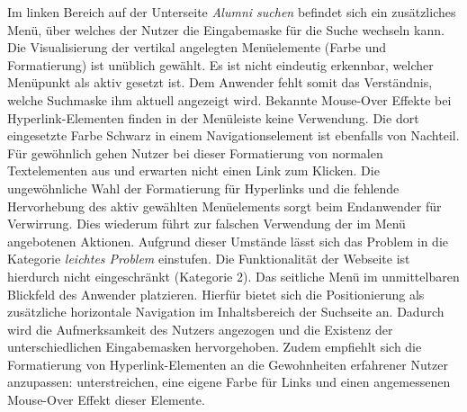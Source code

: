 {
	Im linken Bereich auf der Unterseite \emph{Alumni suchen} befindet sich ein zusätzliches Menü, über welches der Nutzer die Eingabemaske für die Suche wechseln kann. Die Visualisierung der vertikal angelegten Menüelemente (Farbe und Formatierung) ist unüblich gewählt. Es ist nicht eindeutig erkennbar, welcher Menüpunkt als aktiv gesetzt ist. Dem Anwender fehlt somit das Verständnis, welche Suchmaske ihm aktuell angezeigt wird. Bekannte Mouse-Over Effekte bei Hyperlink-Elementen finden in der Menüleiste keine Verwendung. Die dort eingesetzte Farbe Schwarz in einem Navigationselement ist ebenfalls von Nachteil. Für gewöhnlich gehen Nutzer bei dieser Formatierung von normalen Textelementen aus und erwarten nicht einen Link zum Klicken.
}
{
	Die ungewöhnliche Wahl der Formatierung für Hyperlinks und die fehlende Hervorhebung des aktiv gewählten Menüelements sorgt beim Endanwender für Verwirrung. Dies wiederum führt zur falschen Verwendung der im Menü angebotenen Aktionen. Aufgrund dieser Umstände lässt sich das Problem in die Kategorie \emph{leichtes Problem} einstufen. Die Funktionalität der Webseite ist hierdurch nicht eingeschränkt (Kategorie 2).
}
{
	Das seitliche Menü im unmittelbaren Blickfeld des Anwender platzieren. Hierfür bietet sich die Positionierung als zusätzliche horizontale Navigation im Inhaltsbereich der Suchseite an. Dadurch wird die Aufmerksamkeit des Nutzers angezogen und die Existenz der unterschiedlichen Eingabemasken hervorgehoben. Zudem empfiehlt sich die Formatierung von Hyperlink-Elementen an die Gewohnheiten erfahrener Nutzer anzupassen: unterstreichen, eine eigene Farbe für Links und einen angemessenen Mouse-Over Effekt dieser Elemente.
}


